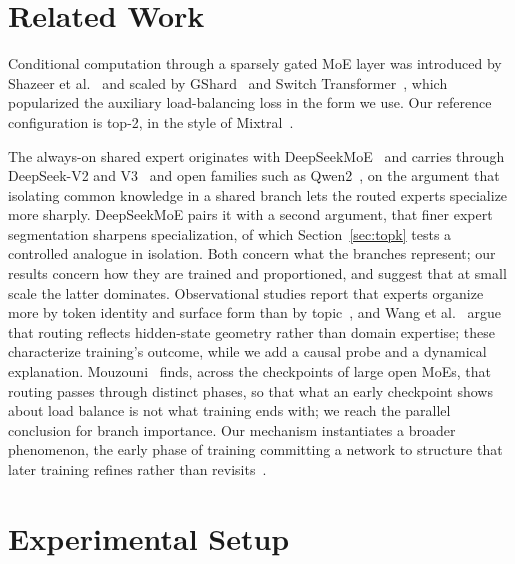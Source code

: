 \documentclass[conference,11pt]{IEEEtran}
\begin{document}
\section{Related Work}

Conditional computation through a sparsely gated MoE layer was introduced by Shazeer et
al.~\cite{shazeer2017outrageously} and scaled by GShard~\cite{lepikhin2021gshard} and Switch
Transformer~\cite{fedus2022switch}, which popularized the auxiliary load-balancing loss in the
form we use. Our reference
configuration is top-2, in the style of Mixtral~\cite{jiang2024mixtral}.

The always-on shared expert originates with DeepSeekMoE~\cite{dai2024deepseekmoe} and carries
through DeepSeek-V2 and V3~\cite{deepseekv2,deepseekv3} and open families such as
Qwen2~\cite{qwen2technical}, on the argument that isolating common knowledge in a shared branch
lets the routed experts specialize more sharply. DeepSeekMoE pairs it with a second argument, that
finer expert segmentation sharpens specialization, of which Section~\ref{sec:topk} tests a
controlled analogue in isolation. Both concern what the branches represent; our results concern
how they are trained and proportioned, and suggest that at small scale the latter dominates.
Observational studies report that experts organize more by token identity and surface form than by
topic~\cite{jiang2024mixtral,muennighoff2024olmoe}, and Wang et al.~\cite{wang2026myth} argue that
routing reflects hidden-state geometry rather than domain expertise; these characterize training's
outcome, while we add a causal probe and a dynamical explanation. Mouzouni~\cite{mouzouni2026phases}
finds, across the checkpoints of large open MoEs, that routing passes through distinct phases, so
that what an early checkpoint shows about load balance is not what training ends with; we reach
the parallel conclusion for branch importance. Our mechanism instantiates a broader phenomenon, the early
phase of training committing a network to structure that later training refines rather than
revisits~\cite{achille2019critical,frankle2020early}.

\section{Experimental Setup}
\end{document}
